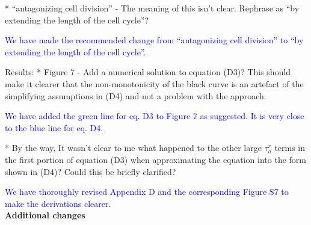 \documentclass[12pt]{extarticle}
\begin{document}
* ``antagonizing cell division'' - The meaning of this isn't clear. Rephrase as ``by extending the length of the cell cycle''?

\textcolor{blue}{We have made the recommended change from ``antagonizing cell division'' to ``by extending the length of the cell cycle''.}  %

Results:
* Figure 7 - Add a numerical solution to equation (D3)? This should make it clearer that the non-monotonicity of the black curve is an artefact of the simplifying assumptions in (D4) and not a problem with the approach.

\textcolor{blue}{We have added the green line for eq. D3 to Figure 7 as suggested. It is very close to the blue line for eq. D4.}

* By the way, It wasn't clear to me what happened to the other large $\tau_a^r$ terms in the first portion of equation (D3) when approximating the equation into the form shown in (D4)? Could this be briefly clarified?

\textcolor{blue}{
We have thoroughly revised Appendix D and the corresponding Figure S7 to make the derivations clearer.
}
\\

\textbf{Additional changes}
\end{document}
